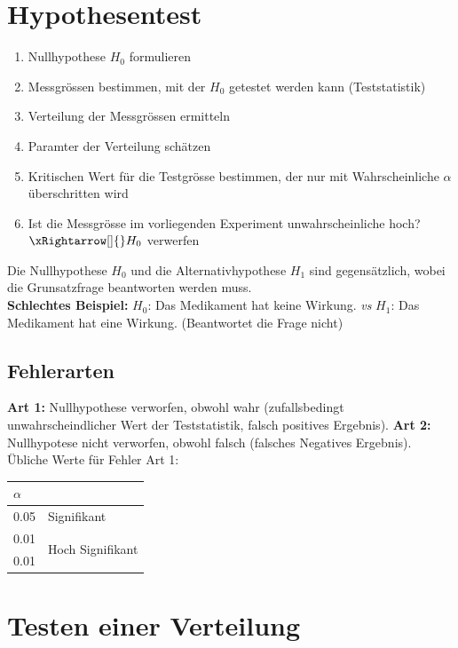 \section{Hypothesentest}\label{nullhypothese}
\begin{enumerate}[nosep]
	\item Nullhypothese $H_0$ formulieren
	\item Messgrössen bestimmen, mit der $H_0$ getestet werden kann (Teststatistik)
	\item Verteilung der Messgrössen ermitteln
	\item Paramter der Verteilung schätzen
	\item Kritischen Wert für die Testgrösse bestimmen, der nur mit Wahrscheinliche $\alpha$ überschritten wird
	\item Ist die Messgrösse im vorliegenden Experiment unwahrscheinliche hoch? $\xRightarrow[]{} H_0$ verwerfen
\end{enumerate}

Die Nullhypothese $H_0$ und die Alternativhypothese $H_1$ sind gegensätzlich, wobei die Grunsatzfrage beantworten werden muss. \\
\textbf{Schlechtes Beispiel:} $H_0$: Das Medikament hat keine Wirkung. \textit{vs} $H_1$: Das Medikament hat eine Wirkung. (Beantwortet die Frage nicht)

\subsection{Fehlerarten}
\textbf{Art 1:} Nullhypothese verworfen, obwohl wahr (zufallsbedingt unwahrscheindlicher Wert der Teststatistik, falsch positives Ergebnis). \textbf{Art 2:} Nullhypotese nicht verworfen, obwohl falsch (falsches Negatives Ergebnis). Übliche Werte für Fehler Art 1:
\begin{center} 
	\begin{tabular}{ll}
	$\alpha$ & \\ \hline
	0.05 & Signifikant \\ \hline
	0.01 & \multirow{2}{*}{Hoch Signifikant} \\
	0.01 &  \\ \hline
\end{tabular}
\end{center}

\section{Testen einer Verteilung}

